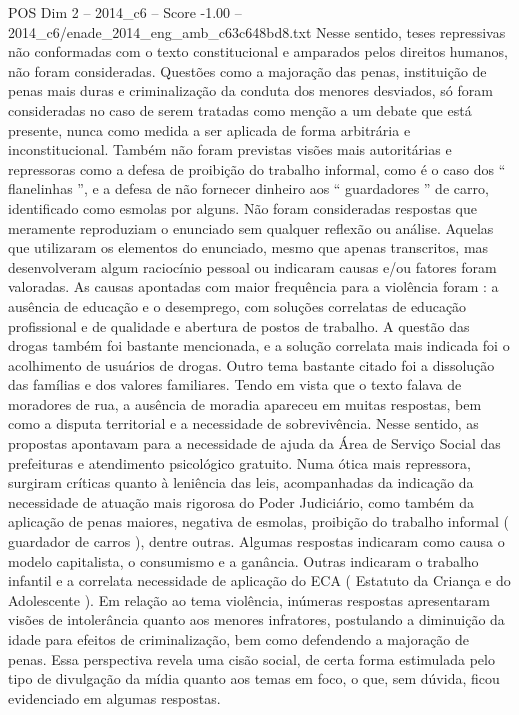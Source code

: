 \begin{textsample}{POS Dim 2 – 2014\_c6 – Score -1.00 – 2014\_c6/enade\_2014\_eng\_amb\_c63c648bd8.txt}
Nesse sentido, teses repressivas não conformadas com o texto constitucional e amparados pelos direitos humanos, não foram consideradas.
Questões como a majoração das penas, instituição de penas mais duras e criminalização da conduta dos menores desviados, só foram consideradas no caso de serem tratadas como menção a um debate que está presente, nunca como medida a ser aplicada de forma arbitrária e inconstitucional.
Também não foram previstas visões mais autoritárias e repressoras como a defesa de proibição do trabalho informal, como é o caso dos “ flanelinhas ”, e a defesa de não fornecer dinheiro aos “ guardadores ” de carro, identificado como esmolas por alguns.
Não foram consideradas respostas que meramente reproduziam o enunciado sem qualquer reflexão ou análise.
Aquelas que utilizaram os elementos do enunciado, mesmo que apenas transcritos, mas desenvolveram algum raciocínio pessoal ou indicaram causas e/ou fatores foram valoradas.
As causas apontadas com maior frequência para a violência foram : a ausência de educação e o desemprego, com soluções correlatas de educação profissional e de qualidade e abertura de postos de trabalho.
A questão das drogas também foi bastante mencionada, e a solução correlata mais indicada foi o acolhimento de usuários de drogas.
Outro tema bastante citado foi a dissolução das famílias e dos valores familiares.
Tendo em vista que o texto falava de moradores de rua, a ausência de moradia apareceu em muitas respostas, bem como a disputa territorial e a necessidade de sobrevivência.
Nesse sentido, as propostas apontavam para a necessidade de ajuda da Área de Serviço Social das prefeituras e atendimento psicológico gratuito.
Numa ótica mais repressora, surgiram críticas quanto à leniência das leis, acompanhadas da indicação da necessidade de atuação mais rigorosa do Poder Judiciário, como também da aplicação de penas maiores, negativa de esmolas, proibição do trabalho informal ( guardador de carros ), dentre outras.
Algumas respostas indicaram como causa o modelo capitalista, o consumismo e a ganância.
Outras indicaram o trabalho infantil e a correlata necessidade de aplicação do ECA ( Estatuto da Criança e do Adolescente ).
Em relação ao tema violência, inúmeras respostas apresentaram visões de intolerância quanto aos menores infratores, postulando a diminuição da idade para efeitos de criminalização, bem como defendendo a majoração de penas.
Essa perspectiva revela uma cisão social, de certa forma estimulada pelo tipo de divulgação da mídia quanto aos temas em foco, o que, sem dúvida, ficou evidenciado em algumas respostas.

\end{textsample}
